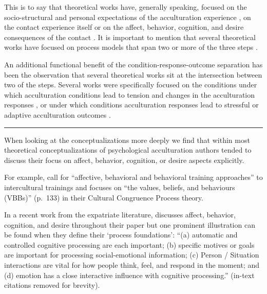 This is to say that theoretical works have, generally speaking, focused
on the socio-structural and personal expectations of the acculturation
experience
\citep[i.e., conditions; e.g.,][]{Kim1988, Rogler1994, Navas2005, Giles1977, Tartakovsky2012, Robinson2019, Ward2016, Serdarevic2005},
on the contact experience itself
\citep[i.e., response; e.g.,][]{Berry1992, Berry2005, Sam2003, Riedel2011, Ward2016}
or on the affect, behavior, cognition, and desire consequences of the
contact
\citep[i.e., outcome; e.g.,][]{Baird2015, Berry1998, Berry1992, Berry2005, Riedel2011, Rogler1994, Luedicke2011}.
It is important to mention that several theoretical works have focused
on process models that span two or more of the three steps
\citep[e.g.,][]{Berry1992, Ward2016, Arends-Toth2006a, Rogler1994}.

An additional functional benefit of the condition-response-outcome
separation has been the observation that several theoretical works sit
at the intersection between two of the steps. Several works were
specifically focused on the conditions under which acculturation
conditions lead to tension and changes in the acculturation responses
\citep[i.e., conditions of change; e.g.,][]{Masgoret2006, Alitolppa-Niitamo2004, Grove1985, Wood2014},
or under which conditions acculturation responses lead to stressful or
adaptive acculturation outcomes
\citep[i.e., conditions of stress; e.g.,][; also see  and Figure S1]{Ryan2008, Berry1992, Benet-Martinez2005, Salo2015, Wood2014, Hajro2019}.

\begin{center}\rule{0.5\linewidth}{0.5pt}\end{center}

When looking at the conceptualizations more deeply we find that within
most theoretical conceptualizations of psychological acculturation
authors tended to discuss their focus on affect, behavior, cognition, or
desire aspects explicitly.

For example, \citet[][]{Bhawuk2006} call for ``affective, behavioral and
behavioral training approaches'' to intercultural trainings
\citep[][Table 30.3]{Bhawuk2006} and \citet[][]{Robinson2019} focuses on
``the values, beliefs, and behaviours (VBBs)'' (p.~133) in their
Cultural Congruence Process theory.

In a recent work from the expatriate literature, \citet[][]{Maertz2016}
discusses affect, behavior, cognition, and desire throughout their paper
but one prominent illustration can be found when they define their
`process foundations': ``(a) automatic and controlled cognitive
processing are each important; (b) specific motives or goals are
important for processing social-emotional information; (c) Person /
Situation interactions are vital for how people think, feel, and respond
in the moment; and (d) emotion has a close interactive influence with
cognitive processing.'' (in-text citations removed for brevity).

